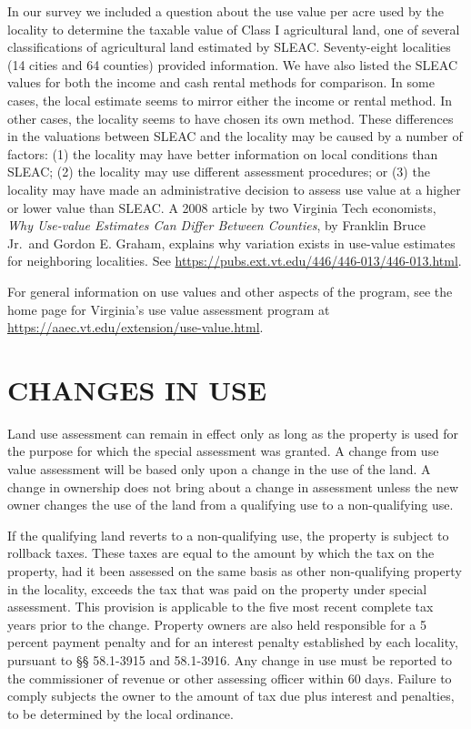 \documentclass[
]{book}
\begin{document}
In our survey we included a question about the use value per acre used by the locality to determine the taxable value of Class I agricultural land, one of several classifications of agricultural land estimated by SLEAC. Seventy-eight localities (14 cities and 64 counties) provided information. We have also listed the SLEAC values for both the income and cash rental methods for comparison. In some cases, the local estimate seems to mirror either the income or rental method. In other cases, the locality seems to have chosen its own method. These differences in the valuations between SLEAC and the locality may be caused by a number of factors: (1) the locality may have better information on local conditions than SLEAC; (2) the locality may use different assessment procedures; or (3) the locality may have made an administrative decision to assess use value at a higher or lower value than SLEAC. A 2008 article by two Virginia Tech economists, \emph{Why Use-value Estimates Can Differ Between Counties}, by Franklin Bruce Jr.~and Gordon E. Graham, explains why variation exists in use-value estimates for neighboring localities. See \url{https://pubs.ext.vt.edu/446/446-013/446-013.html}.

For general information on use values and other aspects of the program, see the home page for Virginia's use value assessment program at \url{https://aaec.vt.edu/extension/use-value.html}.

\hypertarget{changes-in-use}{%
\section{CHANGES IN USE}\label{changes-in-use}}

Land use assessment can remain in effect only as long as the property is used for the purpose for which the special assessment was granted. A change from use value assessment will be based only upon a change in the use of the land. A change in ownership does not bring about a change in assessment unless the new owner changes the use of the land from a qualifying use to a non-qualifying use.

If the qualifying land reverts to a non-qualifying use, the property is subject to rollback taxes. These taxes are equal to the amount by which the tax on the property, had it been assessed on the same basis as other non-qualifying property in the locality, exceeds the tax that was paid on the property under special assessment. This provision is applicable to the five most recent complete tax years prior to the change. Property owners are also held responsible for a 5 percent payment penalty and for an interest penalty established by each locality, pursuant to §§ 58.1-3915 and 58.1-3916. Any change in use must be reported to the commissioner of revenue or other assessing officer within 60 days. Failure to comply subjects the owner to the amount of tax due plus interest and penalties, to be determined by the local ordinance.
\end{document}
